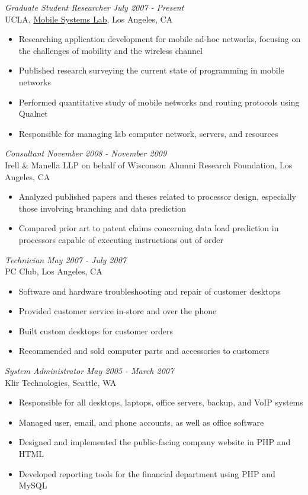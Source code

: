 \documentclass[margin]{res}
\begin{document}
\begin{resume}
{\sl Graduate Student Researcher} \hfill \textit{July 2007 - Present} \\
		UCLA, \href{http://msl.cs.ucla.edu}{Mobile Systems Lab}, Los Angeles, CA
		\begin{itemize}  \itemsep -2pt %
		\item Researching application development for mobile ad-hoc networks, focusing on the challenges of mobility and the wireless channel
		\item Published research surveying the current state of programming in mobile networks
		\item Performed quantitative study of mobile networks and routing protocols using Qualnet
		\item Responsible for managing lab computer network, servers, and resources
		\end{itemize}

{\sl Consultant} \hfill \textit{November 2008 - November 2009} \\
		Irell \& Manella LLP on behalf of Wisconson Alumni Research Foundation, Los Angeles, CA
		\begin{itemize}  \itemsep -2pt %
		\item Analyzed published papers and theses related to processor design, especially those involving branching and data prediction
		\item Compared prior art to patent claims concerning data load prediction in processors capable of executing instructions out of order
		\end{itemize}

{\sl Technician} \hfill \textit{May 2007 - July 2007} \\
		PC Club, Los Angeles, CA
		\begin{itemize}  \itemsep -2pt %
		\item Software and hardware troubleshooting and repair of customer desktops
		\item Provided customer service in-store and over the phone
		\item Built custom desktops for customer orders
		\item Recommended and sold computer parts and accessories to customers
		\end{itemize}

{\sl System Administrator} \hfill \textit{May 2005 - March 2007} \\
		Klir Technologies, Seattle, WA 
		\begin{itemize}  \itemsep -2pt %
		\item Responsible for all desktops, laptops, office servers, backup, and VoIP systems
		\item Managed user, email, and phone accounts, as well as office software
		\item Designed and implemented the public-facing company website in PHP and HTML
		\item Developed reporting tools for the financial department using PHP and MySQL
		\end{itemize}


\end{resume}
\end{document}
